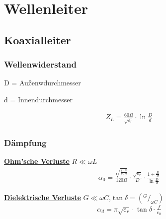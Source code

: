 \section{Wellenleiter}
\subsection{Koaxialleiter}
\subsubsection{Wellenwiderstand}

D = Außenwdurchmesser

d = Innendurchmesser

\begin{align*}
    Z_L = \frac{60\Omega}{\sqrt{\varepsilon_r}}\cdot \ln{\frac{D}{d}}
\end{align*}

\subsubsection{Dämpfung}
\underline{\textbf{Ohm'sche Verluste}} $R\ll\omega L$
\begin{align*}
    \alpha_0 = \frac{\sqrt{\frac{f\cdot\mu}{\pi\cdot\sigma}}}{120\Omega}\cdot\frac{\sqrt{\varepsilon_r}}{D}\cdot\frac{1+\frac{D}{d}}{\ln \frac{D}{d}}
\end{align*}

\underline{\textbf{Dielektrische Verluste}} $G\ll\omega C$,$\tan\delta= (^G/_{\omega C})$
\begin{align*}
    \alpha_d = \pi\sqrt{\varepsilon_r}\cdot\tan\delta\cdot\frac{f}{c_0}
\end{align*}
